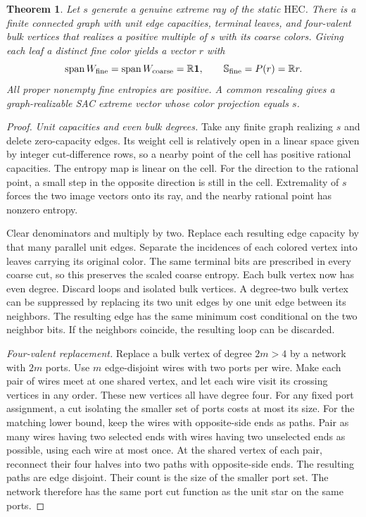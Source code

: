 \documentclass[11pt]{article}
\newtheorem{theorem}{Theorem}[section]
\newcommand{\HEC}{\mathrm{HEC}}
\newcommand{\MC}{\mathbb{S}}
\begin{document}
\begin{theorem}
\label{thm:universal-lift}
Let \(s\) generate a genuine extreme ray of the static \(\HEC\).
There is a finite connected graph with unit edge capacities, terminal
leaves, and four-valent bulk vertices that realizes a positive multiple
of \(s\) with its coarse colors. Giving each leaf a distinct fine
color yields a vector \(r\) with
\[
 \operatorname{span}W_{\rm fine}
 =\operatorname{span}W_{\rm coarse}=\mathbb R\mathbf 1,
 \qquad \MC_{\rm fine}=P(r)=\mathbb Rr.
\]
All proper nonempty fine entropies are positive. A common rescaling
gives a graph-realizable SAC extreme vector whose color projection
equals \(s\).
\end{theorem}

\begin{proof}
\emph{Unit capacities and even bulk degrees.}
Take any finite graph realizing \(s\) and delete zero-capacity edges.
Its weight cell is relatively open in a linear space given by
integer cut-difference rows, so a nearby point of the cell has positive
rational capacities. The entropy map is linear on the cell. For the
direction to the rational point, a small step in the opposite direction
is still in the cell. Extremality of \(s\) forces the two image vectors
onto its ray, and the nearby rational point has nonzero entropy.

Clear denominators and multiply by two. Replace each resulting edge
capacity by that many parallel unit edges. Separate the incidences of
each colored vertex into leaves carrying its original color. The same
terminal bits are prescribed in every coarse cut, so this preserves
the scaled coarse entropy. Each bulk vertex now has even degree.
Discard loops and isolated bulk vertices. A degree-two bulk vertex
can be suppressed by replacing its two unit edges by one unit edge
between its neighbors. The resulting edge has the same minimum cost
conditional on the two neighbor bits. If the neighbors coincide,
the resulting loop can be discarded.

\emph{Four-valent replacement.}
Replace a bulk vertex of degree \(2m>4\) by a network with \(2m\)
ports. Use \(m\) edge-disjoint wires with two ports per wire. Make
each pair of wires meet at one shared vertex, and let each wire
visit its crossing vertices in any order. These new vertices all
have degree four. For any fixed port assignment, a cut isolating
the smaller set of ports costs at most its size. For the matching
lower bound, keep the wires with opposite-side ends as paths.
Pair as many wires having two selected ends with wires having two
unselected ends as possible, using each wire at most once. At the
shared vertex of each pair, reconnect their four halves into two
paths with opposite-side ends. The resulting paths are edge disjoint.
Their count is the size of the smaller port set. The network
therefore has the same port cut function as the unit star on the
same ports.


\end{proof}
\end{document}

